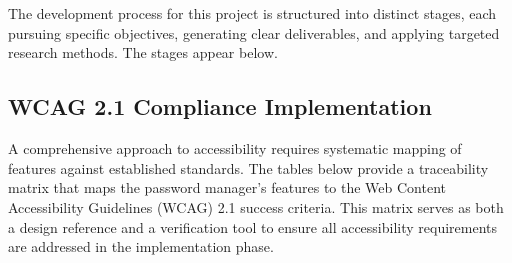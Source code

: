 
\chapter{}%
\label{ch:methodologie}

The development process for this project is structured into distinct stages, each pursuing specific objectives, generating clear deliverables, and applying targeted research methods. The stages appear below.

\section{WCAG 2.1 Compliance Implementation}
\label{sec:wcag-compliance}

A comprehensive approach to accessibility requires systematic mapping of features against established standards. The tables below provide a traceability matrix that maps the password manager's features to the Web Content Accessibility Guidelines (WCAG) 2.1 success criteria. This matrix serves as both a design reference and a verification tool to ensure all accessibility requirements are addressed in the implementation phase.

